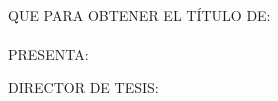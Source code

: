 \begin{titlepage}
\begin{minipage}[c][9.5cm][s]{10cm}
\begin{center}
      \\[8pt]
      QUE PARA OBTENER EL T\'ITULO DE:\\[3pt]
      \mbox{}\lacarrera\\[13pt]
      PRESENTA:\\[3pt]
      \elnombre

      \vspace{2cm}

      {\small DIRECTOR DE TESIS:\\ \eldirector}

      \vspace{2cm}

      \lafecha
      
    \end{center}
  \end{minipage}
\pagebreak
\end{titlepage}


